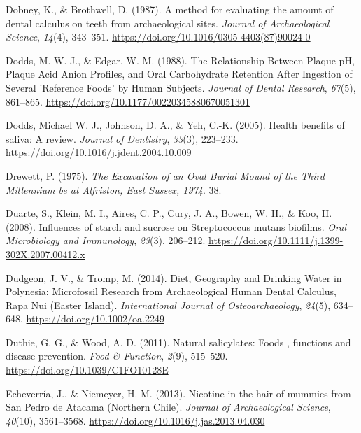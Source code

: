 \documentclass[
  letterpaper,
]{book}
\newlength{\cslhangindent}
\newlength{\cslentryspacingunit} %
\newenvironment{CSLReferences}[2] %
 {%
  \setlength{\parindent}{0pt}
  \ifodd #1
  \let\oldpar\par
  \def\par{\hangindent=\cslhangindent\oldpar}
  \fi
  \setlength{\parskip}{#2\cslentryspacingunit}
 }%
 {}
\begin{document}
\begin{CSLReferences}{1}{0}
\leavevmode{}%
Dobney, K., \& Brothwell, D. (1987). A method for evaluating the amount
of dental calculus on teeth from archaeological sites. \emph{Journal of
Archaeological Science}, \emph{14}(4), 343--351.
\url{https://doi.org/10.1016/0305-4403(87)90024-0}

\leavevmode{}%
Dodds, M. W. J., \& Edgar, W. M. (1988). The {Relationship Between
Plaque pH}, {Plaque Acid Anion Profiles}, and {Oral Carbohydrate
Retention After Ingestion} of {Several} '{Reference Foods}' by {Human
Subjects}. \emph{Journal of Dental Research}, \emph{67}(5), 861--865.
\url{https://doi.org/10.1177/00220345880670051301}

\leavevmode{}%
Dodds, Michael W. J., Johnson, D. A., \& Yeh, C.-K. (2005). Health
benefits of saliva: A review. \emph{Journal of Dentistry}, \emph{33}(3),
223--233. \url{https://doi.org/10.1016/j.jdent.2004.10.009}

\leavevmode{}%
Drewett, P. (1975). \emph{The {Excavation} of an {Oval Burial Mound} of
the {Third Millennium} be at {Alfriston}, {East Sussex}, 1974}. 38.

\leavevmode{}%
Duarte, S., Klein, M. I., Aires, C. P., Cury, J. A., Bowen, W. H., \&
Koo, H. (2008). Influences of starch and sucrose on {Streptococcus}
mutans biofilms. \emph{Oral Microbiology and Immunology}, \emph{23}(3),
206--212. \url{https://doi.org/10.1111/j.1399-302X.2007.00412.x}

\leavevmode{}%
Dudgeon, J. V., \& Tromp, M. (2014). Diet, {Geography} and {Drinking
Water} in {Polynesia}: {Microfossil Research} from {Archaeological Human
Dental Calculus}, {Rapa Nui} ({Easter Island}). \emph{International
Journal of Osteoarchaeology}, \emph{24}(5), 634--648.
\url{https://doi.org/10.1002/oa.2249}

\leavevmode{}%
Duthie, G. G., \& Wood, A. D. (2011). Natural salicylates: Foods ,
functions and disease prevention. \emph{Food \& Function}, \emph{2}(9),
515--520. \url{https://doi.org/10.1039/C1FO10128E}

\leavevmode{}%
Echeverría, J., \& Niemeyer, H. M. (2013). Nicotine in the hair of
mummies from {San Pedro} de {Atacama} ({Northern Chile}). \emph{Journal
of Archaeological Science}, \emph{40}(10), 3561--3568.
\url{https://doi.org/10.1016/j.jas.2013.04.030}


\end{CSLReferences}
\end{document}
